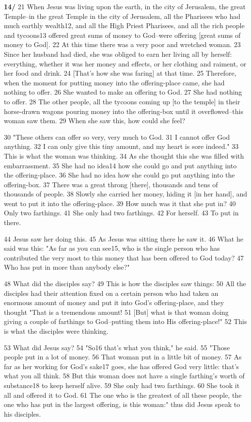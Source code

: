 \textbf{14/}  21 When Jesus was living upon the earth, in the city of Jerusalem,
the great Temple--in the great Temple in the city of Jerusalem, all the Pharisees
who had much earthly wealth12, and all the High Priest Pharisees, and all the rich
people and tycoons13 offered great sums of money to God--were offering [great sums
of money to God]. 22 At this time there was a very poor and wretched woman. 23
Since her husband had died, she was obliged to earn her living all by herself:
everything, whether it was her money and effects, or her clothing and raiment,
or her food and drink. 24 [That's how she was faring] at that time. 25 Therefore,
when the moment for putting money into the offering-place came, she had nothing
to offer. 26 She wanted to make an offering to God. 27 She had nothing to offer.
28 The other people, all the tycoons coming up [to the temple] in their horse-drawn
wagons pouring money into the offering-box until it overflowed--this woman saw
them. 29 When she saw this, how could she feel?

30 "These others can offer so very, very much to God. 31 I cannot offer
God anything. 32 I can only give this tiny amount, and my heart is sore indeed."
33 This is what the woman was thinking. 34 As she thought this she was filled with
embarrassment. 35 She had no idea14 how she could go and put anything into the
offering-place. 36 She had no idea how she could go put anything into the offering-box.
37 There was a great throng [there], thousands and tens of thousands of people.
38 Slowly she carried her money, hiding it [in her hand], and went to put it into
the offering-place. 39 How much was it that she put in? 40 Only two farthings.
41 She only had two farthings. 42 For herself. 43 To put in there.

44 Jesus saw her doing this. 45 As Jesus was sitting there he saw it. 46 What he
said was this: "As far as you can see15, who is the single person who
has contributed the very most to this money that has been offered to God today?
47 Who has put in more than anybody else?"

48 What did the disciples say? 49 This is how the disciples saw things: 50 All
the disciples had their attention fixed on a certain person who had taken an enormous
amount of money and put it into God's offering-place, and they thought "That
is a tremendous amount! 51 [But] what is that woman doing giving a couple of farthings
to God--putting them into His offering-place!" 52 This is what the disciples
were thinking.

53 What did Jesus say? 54 "So16 that's what you think," he said.
55 "Those people put in a lot of money. 56 That woman put in a little
bit of money. 57 As far as her working for God's sake17 goes, she has offered God
very little: that's what you all think. 58 But this woman does not have a single
farthing's worth of substance18 to keep herself alive. 59 She only had two farthings.
60 She took it all and offered it to God. 61 The one who is the greatest of all
these people, the one who has put in the largest offering, is this woman:"
thus did Jesus speak to his disciples.


